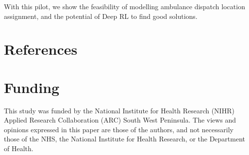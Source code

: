 \documentclass{article}
\begin{document}
With this pilot, we show the feasibility of modelling ambulance dispatch location assignment, and the potential of Deep RL to find good solutions.


\section{References}




\section*{Funding}

This study was funded by the National Institute for Health Research (NIHR) Applied Research Collaboration (ARC) South West Peninsula. The views and opinions expressed in this paper are those of the authors, and not necessarily those of the NHS, the National Institute for Health Research, or the Department of Health.
\end{document}
